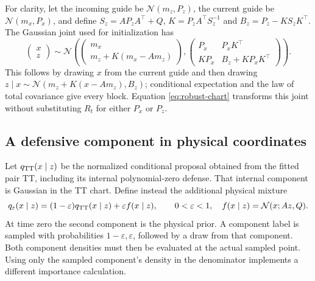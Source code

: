 For clarity, let the incoming guide be $\mathcal N(m_z,P_z)$, the current
guide be $\mathcal N(m_x,P_x)$, and define
$S_z=A P_zA^\top+Q$, $K=P_zA^\top S_z^{-1}$ and
$B_z=P_z-KS_zK^\top$. The Gaussian joint used for initialization has
\begin{equation}
 \begin{pmatrix}x\\z\end{pmatrix}\sim\mathcal N\!\left(
 \begin{pmatrix}m_x\\m_z+K(m_x-Am_z)\end{pmatrix},
 \begin{pmatrix}P_x&P_xK^\top\\KP_x&B_z+KP_xK^\top\end{pmatrix}
 \right).
 \label{eq:robust-initializer-joint}
\end{equation}
This follows by drawing $x$ from the current guide and then drawing
$z\mid x\sim\mathcal N(m_z+K(x-Am_z),B_z)$; conditional expectation
and the law of total covariance give every block. Equation
\eqref{eq:robust-chart} transforms this joint without substituting $R_t$
for either $P_x$ or $P_z$.

\subsection{A defensive component in physical coordinates}

Let $q_{\rm TT}(x\mid z)$ be the normalized conditional proposal obtained
from the fitted pair TT, including its internal polynomial-zero defense.
That internal component is Gaussian in the TT chart. Define instead the
additional physical mixture
\begin{equation}
 q_\varepsilon(x\mid z)
 =(1-\varepsilon)q_{\rm TT}(x\mid z)
       +\varepsilon f(x\mid z),\qquad 0<\varepsilon<1,
 \quad f(x\mid z)=\mathcal N(x;Az,Q).
 \label{eq:robust-mixture}
\end{equation}
At time zero the second component is the physical prior. A component label
is sampled with probabilities $1-\varepsilon,\varepsilon$, followed by a
draw from that component. Both component densities must then be evaluated
at the actual sampled point. Using only the sampled component's density in
the denominator implements a different importance calculation.

